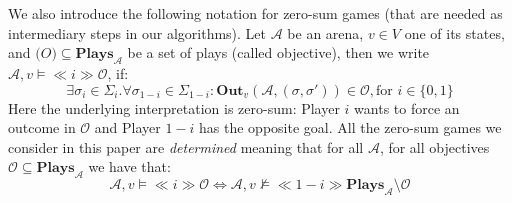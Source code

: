 We also introduce the following notation for zero-sum games (that are needed as intermediary steps in our algorithms). Let $\mathcal{A}$ be an arena, $v \in V$ one of its states, and $\mathcal(O) \subseteq \mathbf{Plays}_{\mathcal{A}}$ be a set of plays (called objective), then we write $ \mathcal{A}, v \models \ll i \gg \mathcal{O}$, if:
\begin{equation*}
    \exists \sigma_i\in \Sigma_i . \forall \sigma_{1-i} \in \Sigma_{1-i}: \mathbf{Out}_v(\mathcal{A}, (\sigma, \sigma')) \in \mathcal{O}, \text{for } i \in \{0,1\}
\end{equation*}
Here the underlying interpretation is zero-sum: Player $i$ wants to force an outcome in $\mathcal{O}$ and Player $1-i$ has the opposite goal. All the zero-sum games we consider in this paper are \textit{determined} meaning that for all $\mathcal{A}$, for all objectives $\mathcal{O} \subseteq \mathbf{Plays}_{\mathcal{A}}$ we have that:
\begin{equation*}
    \mathcal{A}, v \models \ll i \gg \mathcal{O} \iff \mathcal{A}, v \nvDash \ll 1-i \gg \mathbf{Plays}_{\mathcal{A}} \setminus \mathcal{O}
\end{equation*}

